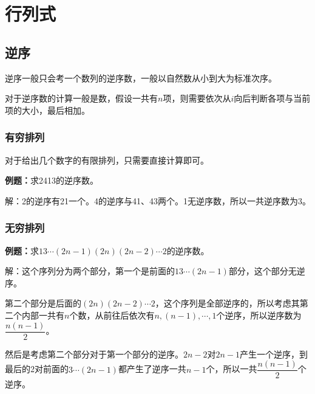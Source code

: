 \setcounter{tocdepth}{4}
\setcounter{secnumdepth}{4}
\renewcommand{\baselinestretch}{1.5}
\usepackage{rotating}
\chapter{行列式}
\section{逆序}

逆序一般只会考一个数列的逆序数，一般以自然数从小到大为标准次序。

对于逆序数的计算一般是数，假设一共有$n$项，则需要依次从$i$向后判断各项与当前项的大小，最后相加。

\subsection{有穷排列}

对于给出几个数字的有限排列，只需要直接计算即可。

\textbf{例题：}求2413的逆序数。

解：2的逆序有21一个。4的逆序与41、43两个。1无逆序数，所以一共逆序数为3。

\subsection{无穷排列}

\textbf{例题：}求$13\cdots(2n-1)(2n)(2n-2)\cdots2$的逆序数。

解：这个序列分为两个部分，第一个是前面的$13\cdots(2n-1)$部分，这个部分无逆序。

第二个部分是后面的$(2n)(2n-2)\cdots2$，这个序列是全部逆序的，所以考虑其第二个内部一共有$n$个数，从前往后依次有$n,(n-1),\cdots,1$个逆序，所以逆序数为$\dfrac{n(n-1)}{2}$。

然后是考虑第二个部分对于第一个部分的逆序。$2n-2$对$2n-1$产生一个逆序，到最后的2对前面的$3\cdots(2n-1)$都产生了逆序一共$n-1$个，所以一共$\dfrac{n(n-1)}{2}$个逆序。

